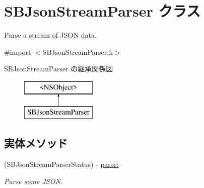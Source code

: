 \hypertarget{interface_s_b_json_stream_parser}{}\section{S\+B\+Json\+Stream\+Parser クラス}
\label{interface_s_b_json_stream_parser}


Parse a stream of J\+S\+O\+N data.  




{\ttfamily \#import $<$S\+B\+Json\+Stream\+Parser.\+h$>$}

S\+B\+Json\+Stream\+Parser の継承関係図\begin{figure}[H]
\begin{center}
\leavevmode
\includegraphics[height=2.000000cm]{interface_s_b_json_stream_parser}
\end{center}
\end{figure}
\subsection*{実体メソッド}
\begin{DoxyCompactItemize}
\item 
(S\+B\+Json\+Stream\+Parser\+Status) -\/ \hyperlink{interface_s_b_json_stream_parser_a9c4b15221e738a1eb49079e266daa1bf}{parse\+:}
\begin{DoxyCompactList}\small\item\em Parse some J\+S\+O\+N. \end{DoxyCompactList}\end{DoxyCompactItemize}
